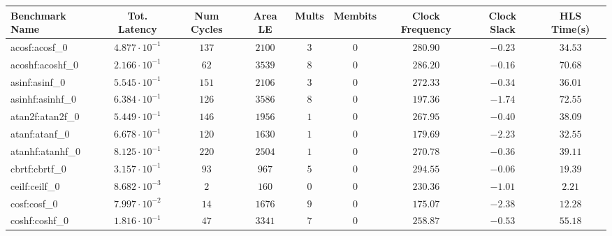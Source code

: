 \begin{tabular}{|l|c|c|c|c|c|c|c|c|}
\hline
Benchmark Name               & Tot. Latency            & Num Cycles & Area LE   & Mults   & Membits & Clock Frequency & Clock Slack & HLS Time(s) \\
\hline
acosf:acosf\_0               & $ 4.877 \cdot 10^{-1} $ & $ 137    $ & $ 2100  $ & $ 3   $ & $ 0   $ & $ 280.90      $ & $ -0.23   $ & $ 34.53   $ \\
acoshf:acoshf\_0             & $ 2.166 \cdot 10^{-1} $ & $ 62     $ & $ 3539  $ & $ 8   $ & $ 0   $ & $ 286.20      $ & $ -0.16   $ & $ 70.68   $ \\
asinf:asinf\_0               & $ 5.545 \cdot 10^{-1} $ & $ 151    $ & $ 2106  $ & $ 3   $ & $ 0   $ & $ 272.33      $ & $ -0.34   $ & $ 36.01   $ \\
asinhf:asinhf\_0             & $ 6.384 \cdot 10^{-1} $ & $ 126    $ & $ 3586  $ & $ 8   $ & $ 0   $ & $ 197.36      $ & $ -1.74   $ & $ 72.55   $ \\
atan2f:atan2f\_0             & $ 5.449 \cdot 10^{-1} $ & $ 146    $ & $ 1956  $ & $ 1   $ & $ 0   $ & $ 267.95      $ & $ -0.40   $ & $ 38.09   $ \\
atanf:atanf\_0               & $ 6.678 \cdot 10^{-1} $ & $ 120    $ & $ 1630  $ & $ 1   $ & $ 0   $ & $ 179.69      $ & $ -2.23   $ & $ 32.55   $ \\
atanhf:atanhf\_0             & $ 8.125 \cdot 10^{-1} $ & $ 220    $ & $ 2504  $ & $ 1   $ & $ 0   $ & $ 270.78      $ & $ -0.36   $ & $ 39.11   $ \\
cbrtf:cbrtf\_0               & $ 3.157 \cdot 10^{-1} $ & $ 93     $ & $ 967   $ & $ 5   $ & $ 0   $ & $ 294.55      $ & $ -0.06   $ & $ 19.39   $ \\
ceilf:ceilf\_0               & $ 8.682 \cdot 10^{-3} $ & $ 2      $ & $ 160   $ & $ 0   $ & $ 0   $ & $ 230.36      $ & $ -1.01   $ & $ 2.21    $ \\
cosf:cosf\_0                 & $ 7.997 \cdot 10^{-2} $ & $ 14     $ & $ 1676  $ & $ 9   $ & $ 0   $ & $ 175.07      $ & $ -2.38   $ & $ 12.28   $ \\
coshf:coshf\_0               & $ 1.816 \cdot 10^{-1} $ & $ 47     $ & $ 3341  $ & $ 7   $ & $ 0   $ & $ 258.87      $ & $ -0.53   $ & $ 55.18   $ \\

\end{tabular}
